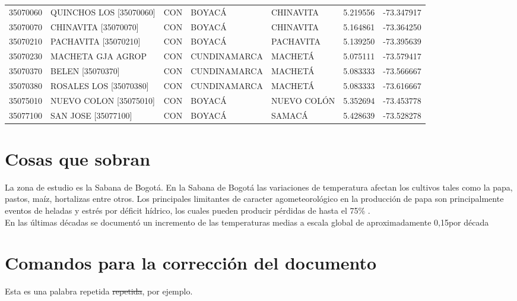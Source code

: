 \begin{longtable}{rllllrr}
 35070060 &   QUINCHOS LOS   [35070060] &  CON &           BOYACÁ &         CHINAVITA &  5.219556 & -73.347917 \\
 35070070 &     CHINAVITA    [35070070] &  CON &           BOYACÁ &         CHINAVITA &  5.164861 & -73.364250 \\
 35070210 &        PACHAVITA [35070210] &  CON &           BOYACÁ &         PACHAVITA &  5.139250 & -73.395639 \\
 35070230 &           MACHETA GJA AGROP &  CON &     CUNDINAMARCA &           MACHETÁ &  5.075111 & -73.579417 \\
 35070370 &            BELEN [35070370] &  CON &     CUNDINAMARCA &           MACHETÁ &  5.083333 & -73.566667 \\
 35070380 &      ROSALES LOS [35070380] &  CON &     CUNDINAMARCA &           MACHETÁ &  5.083333 & -73.616667 \\
 35075010 &    NUEVO COLON   [35075010] &  CON &           BOYACÁ &       NUEVO COLÓN &  5.352694 & -73.453778 \\
 35077100 &       SAN JOSE   [35077100] &  CON &           BOYACÁ &            SAMACÁ &  5.428639 & -73.528278 \\
\end{longtable}

\section{Cosas que sobran}


La zona de estudio es la Sabana de Bogotá. En la Sabana de Bogotá las variaciones de temperatura afectan los cultivos tales como la papa, pastos, maíz, hortalizas entre otros. Los principales limitantes de caracter agometeorológico en la producción de papa son principalmente eventos de heladas y estrés por déficit hídrico, los cuales pueden producir pérdidas de hasta el 75\% \citep{DANE2002}.\\

En las últimas décadas se documentó un incremento de las temperaturas medias a escala global de aproximadamente 0,15\celc por década \citep{jones2001} 

\section{Comandos para la corrección del documento}

Esta es una palabra repetida \sout{repetida}, por ejemplo. \\

